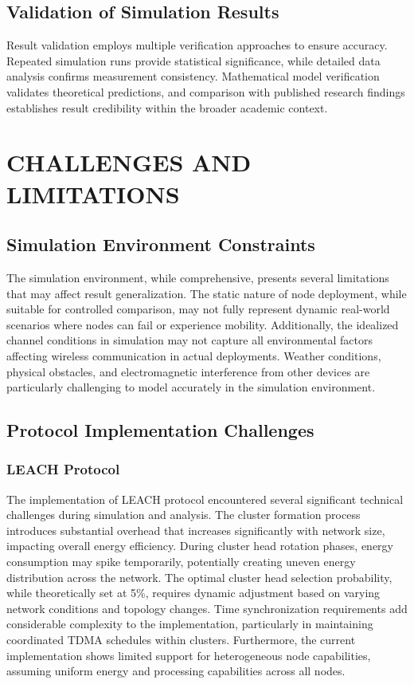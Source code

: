 \documentclass[conference]{IEEEtran}
\begin{document}
\subsection{Validation of Simulation Results}
Result validation employs multiple verification approaches to ensure accuracy. Repeated simulation runs provide statistical significance, while detailed data analysis confirms measurement consistency. Mathematical model verification validates theoretical predictions, and comparison with published research findings establishes result credibility within the broader academic context.

\section{CHALLENGES AND LIMITATIONS}

\subsection{Simulation Environment Constraints}
The simulation environment, while comprehensive, presents several limitations that may affect result generalization. The static nature of node deployment, while suitable for controlled comparison, may not fully represent dynamic real-world scenarios where nodes can fail or experience mobility. Additionally, the idealized channel conditions in simulation may not capture all environmental factors affecting wireless communication in actual deployments. Weather conditions, physical obstacles, and electromagnetic interference from other devices are particularly challenging to model accurately in the simulation environment.

\subsection{Protocol Implementation Challenges}
\subsubsection{LEACH Protocol}
The implementation of LEACH protocol encountered several significant technical challenges during simulation and analysis. The cluster formation process introduces substantial overhead that increases significantly with network size, impacting overall energy efficiency. During cluster head rotation phases, energy consumption may spike temporarily, potentially creating uneven energy distribution across the network. The optimal cluster head selection probability, while theoretically set at 5\%, requires dynamic adjustment based on varying network conditions and topology changes. Time synchronization requirements add considerable complexity to the implementation, particularly in maintaining coordinated TDMA schedules within clusters. Furthermore, the current implementation shows limited support for heterogeneous node capabilities, assuming uniform energy and processing capabilities across all nodes.
\end{document}

